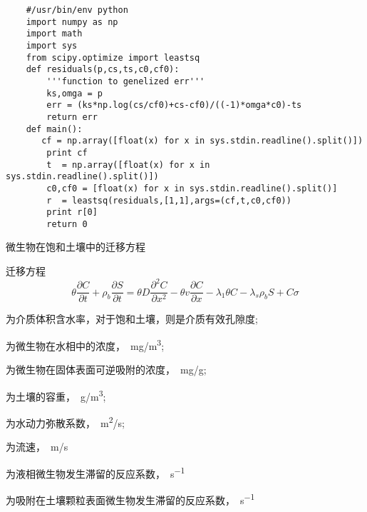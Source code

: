 \documentclass[xcolor=dvipsnames]{beamer}
\begin{document}
	\begin{frame}
	\begin{verbatim}
	#/usr/bin/env python
	import numpy as np
	import math
	import sys
	from scipy.optimize import leastsq
	def residuals(p,cs,ts,c0,cf0):
    	'''function to genelized err'''
    	ks,omga = p
    	err = (ks*np.log(cs/cf0)+cs-cf0)/((-1)*omga*c0)-ts
    	return err
	def main():
 	   cf = np.array([float(x) for x in sys.stdin.readline().split()])
	    print cf
	    t  = np.array([float(x) for x in sys.stdin.readline().split()])
	    c0,cf0 = [float(x) for x in sys.stdin.readline().split()]
	    r  = leastsq(residuals,[1,1],args=(cf,t,c0,cf0))
	    print r[0]
	    return 0
	\end{verbatim}
	\end{frame}
	\begin{frame}{微生物在饱和土壤中的迁移方程}
	\begin{block}{\fangsong 迁移方程}
	\begin{equation}\label{qianyif}
	\theta\dfrac{\partial C}{\partial t}+\rho_b\dfrac{\partial S}{\partial t}
	=\theta D\dfrac{\partial^2 C}{\partial x^2}-\theta v\dfrac{\partial C}{\partial x}
	-\lambda_1\theta C-\lambda_s\rho_b S+C\sigma
	\end{equation}
	\end{block}
	\begin{description}\setlength{\itemsep}{0em}
	\item[$\theta$]为介质体积含水率，对于饱和土壤，则是介质有效孔隙度;
	\item[$C$]为微生物在水相中的浓度，\SI{}{mg/m^3};
	\item[$S$]为微生物在固体表面可逆吸附的浓度，\SI{}{mg/g};
	\item[$\rho_b$]为土壤的容重，\SI{}{g/m^3};
	\item[$D$]为水动力弥散系数，\SI{}{m^2/s};
	\item[$v$]为流速，\SI{}{m/s}
	\item[$\lambda_l$]为液相微生物发生滞留的反应系数，\SI{}{s^{-1}}
	\item[$\lambda_s$]为吸附在土壤颗粒表面微生物发生滞留的反应系数，\SI{}{s^{-1}}
	\end{description}
	\end{frame}
\end{document}
